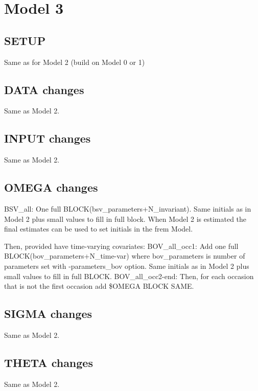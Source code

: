 \section{Model 3}
\subsection{SETUP}
Same as for Model 2 (build on Model 0 or 1)

\subsection{DATA changes}
Same as Model 2.
\subsection{INPUT changes}
Same as Model 2.

\subsection{OMEGA changes}
BSV\_all: One full BLOCK(bsv\_parameters+N\_invariant).
Same initials as in Model 2 plus small values to fill in full block. When Model 2 is estimated
the final estimates can be used to set initials in the frem Model.

Then, provided have time-varying covariates:
BOV\_all\_occ1: Add one full BLOCK(bov\_parameters+N\_time-var) where bov\_parameters is number of parameters set with -parameters\_bov option.
Same initials as in Model 2 plus small values to fill in full BLOCK.
BOV\_all\_occ2-end: Then, for each occasion that is not the first occasion add \$OMEGA BLOCK SAME.

\subsection{SIGMA changes}
Same as Model 2.

\subsection{THETA changes}
Same as Model 2.

